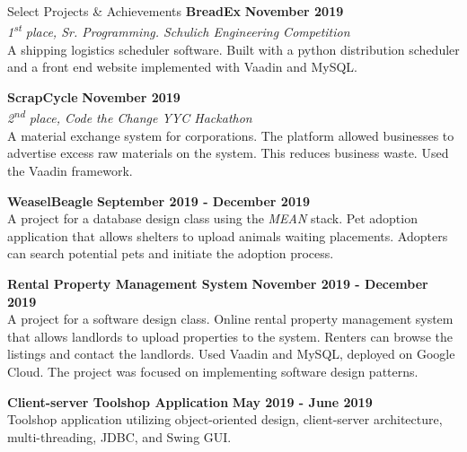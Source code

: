 \documentclass{resume} %
\begin{document}
\begin{Entry}{Select Projects \& Achievements}
{\bf BreadEx } \hfill {\bf November 2019}
\\{\em 1\textsuperscript{st} place, Sr. Programming. Schulich Engineering Competition}
\\ A shipping logistics scheduler software. Built with a python distribution scheduler and a front end website implemented with Vaadin and MySQL.

{\bf ScrapCycle} \hfill {\bf November 2019}
\\{\em 2\textsuperscript{nd} place, Code the Change YYC Hackathon }
\\ A material exchange system for corporations. The platform allowed businesses to advertise excess raw
materials on the system. This reduces business waste. Used the Vaadin framework.


{\bf WeaselBeagle} \hfill {\bf September 2019 - December 2019}
\\ A project for a database design class using the {\em MEAN} stack. Pet adoption application that allows shelters to upload animals waiting placements. Adopters can search potential pets and initiate the adoption process. 

{\bf Rental Property Management System} \hfill {\bf November 2019 - December 2019}
\\ A project for a software design class. Online rental property management system that allows landlords to upload properties to the system. Renters can browse the listings and contact the landlords. Used Vaadin and MySQL, deployed on Google Cloud. The project was focused on implementing software design patterns.

{\bf Client-server Toolshop Application} \hfill {\bf May 2019 - June 2019}
\\ Toolshop application utilizing object-oriented design, client-server architecture, multi-threading, JDBC, and Swing GUI.
\end{Entry}
\end{document}
